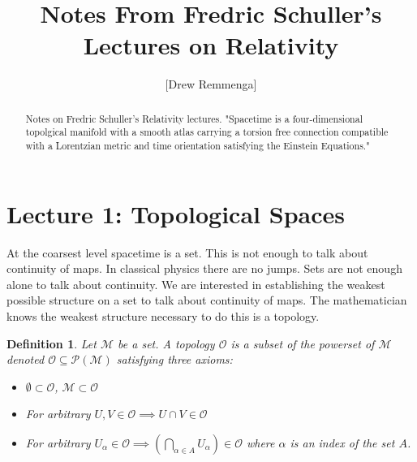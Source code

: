 \documentclass[10pt, oneside]{article}
\title{Notes From Fredric Schuller's Lectures on Relativity}
\author{[Drew Remmenga]}
\newtheorem{defn}{Definition}
\begin{document}
\maketitle
\begin{abstract}
   Notes on Fredric Schuller's Relativity lectures. "Spacetime is a four-dimensional topolgical manifold with a smooth atlas carrying a torsion free connection compatible with a Lorentzian metric and time orientation satisfying the Einstein Equations."
\end{abstract}
\section{Lecture 1: Topological Spaces}
  At the coarsest level spacetime is a set. This is not enough to talk about continuity of maps. In classical physics there are no jumps. Sets are not enough alone to talk about continuity. We are interested in establishing the weakest possible structure on a set to talk about continuity of maps.
  The mathematician knows the weakest structure necessary to do this is a topology.
  \begin{defn}
      Let $\mathcal{M}$ be a set. A topology $\mathcal{O}$ is a subset of the powerset of $\mathcal{M}$ denoted $\mathcal{O} \subseteq \mathcal{P}(\mathcal{M})$ satisfying three axioms:
     \begin{itemize}
        \item $\emptyset \subset \mathcal{O}$, $\mathcal{M} \subset \mathcal{O}$
        \item For arbitrary $U, V \in \mathcal{O} \implies U \cap V \in \mathcal{O}$
        \item For arbitrary $U_\alpha \in \mathcal{O} \implies (\bigcap_{\alpha \in A} U_\alpha) \in \mathcal{O}$ where $\alpha$ is an index of the set $A$.
     \end{itemize}
  \end{defn}
\end{document}
